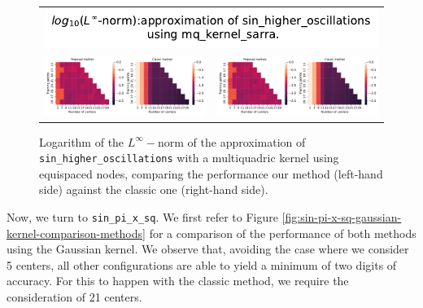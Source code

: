 \documentclass[12pt]{report} %
\begin{document}
\begin{figure}[h]
  \begin{tabular}{cc}
    \multicolumn{2}{c}{{\includegraphics[width=.5\textwidth]
    {imagenes/experiments/1d/variational/linf_sin_higher_oscillations_mq_kernel_sarra_Methods_Title.pdf}}}                                                                                       \\
    {\includegraphics[height=.4\textwidth, trim={0 0 11.5cm 0},clip=true]
    {imagenes/experiments/1d/variational/linf_sin_higher_oscillations_mq_kernel_sarra_Methods_Comparison.pdf}}  &
     {\includegraphics[height=.4\textwidth, trim={9.5cm 0 0 0},clip=true]{imagenes/experiments/1d/variational/linf_sin_higher_oscillations_mq_kernel_sarra_Methods_Comparison.pdf}} \\
  \end{tabular}
  \caption{Logarithm of the $L^\infty-$norm of the approximation of \texttt{sin\_higher\_oscillations} with a multiquadric kernel using equispaced nodes, comparing the performance our method (left-hand side) against the classic one (right-hand side).}
  \label{fig:sin-higher-oscillations-mq-kernel-sarra-comparison-methods}
\end{figure}

Now, we turn to \texttt{sin\_pi\_x\_sq}. We first refer to Figure \ref{fig:sin-pi-x-sq-gaussian-kernel-comparison-methods} for a comparison of the performance of both methods using the Gaussian kernel. We observe that, avoiding the case where we consider 5 centers, all other configurations are able to yield a minimum of two digits of accuracy. For this to happen with the classic method, we require the consideration of 21 centers.
\end{document}
